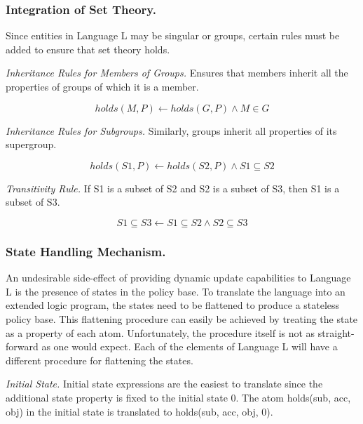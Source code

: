 \documentclass{llncs}
\begin{document}
      \subsubsection{Integration of Set Theory.}

        Since entities in Language L may be singular or groups, certain rules
        must be added to ensure that set theory holds.

        \emph{Inheritance Rules for Members of Groups.} Ensures that members
        inherit all the properties of groups of which it is a member.

        \begin{equation}
          holds(M, P) \leftarrow holds(G, P) \land M \in G
        \end{equation}

        \emph{Inheritance Rules for Subgroups.} Similarly, groups inherit all
        properties of its supergroup.

        \begin{equation}
          holds(S1, P) \leftarrow holds(S2, P) \land S1 \subseteq S2
        \end{equation}

        \emph{Transitivity Rule.} If S1 is a subset of S2 and S2 is a subset
        of S3, then S1 is a subset of S3.

        \begin{equation}
          S1 \subseteq S3 \leftarrow S1 \subseteq S2 \land S2 \subseteq S3
        \end{equation}

      \subsubsection{State Handling Mechanism.}

        An undesirable side-effect of providing dynamic update capabilities to
        Language L is the presence of states in the policy base. To translate
        the language into an extended logic program, the states need to be
        flattened to produce a stateless policy base. This flattening
        procedure can easily be achieved by treating the state as a property
        of each atom. Unfortunately, the procedure itself is not as straight-
        forward as one would expect. Each of the elements of Language L will
        have a different procedure for flattening the states.

        \emph{Initial State.} Initial state expressions are the easiest to
        translate since the additional state property is fixed to the initial
        state 0. The atom holds(sub, acc, obj) in the initial state is
        translated to holds(sub, acc, obj, 0).
\end{document}
